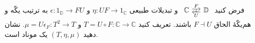 فرض کنید $\begin{tikzcd}[sep=small]
  \mathbb{C}\arrow[r, shift left=.5ex, "F"{name=F}] & \mathbb{D}\arrow[l, shift left=.5ex, "U"{name=U}]
  \arrow[phantom, from=U, to=F, , "\scriptscriptstyle\boldsymbol{\bot}"]
\end{tikzcd}$ و تبدیلات طبیعی $\eta : UF \to 1_\mathbb{C}$ و $\epsilon : 1_\mathbb{D} \to FU$ به ترتیب یکّه و هم‌یکّهٔ الحاق $F \dashv U$ باشند. تعریف کنید $T = U \circ F : \mathbb{C} \to \mathbb{C}$ و $\mu = U \epsilon_F : T^2 \to T$. نشان دهید $(T, \eta, \mu)$ یک موناد است.
